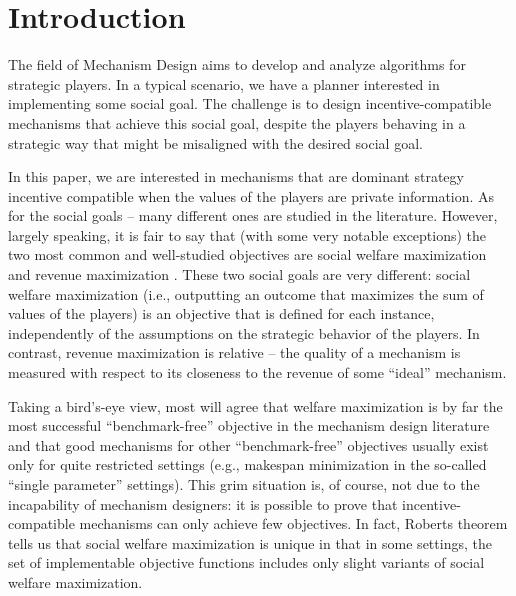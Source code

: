 \documentclass{article}
\begin{document}
\section{Introduction}

The field of Mechanism Design aims to develop and analyze algorithms for strategic players. In a typical scenario, we have a planner interested in implementing some social goal. The challenge is to design incentive-compatible mechanisms that achieve this social goal, despite the players behaving in a strategic way that might be misaligned with the desired social goal.

In this paper, we are interested in mechanisms that are dominant strategy incentive compatible when the values of the players are private information. As for the social goals -- many different ones are studied in the literature. However, largely speaking, it is fair to say that (with some very notable exceptions) the two most common and well-studied objectives are social welfare maximization \cite{Vic61,Cla71,Gro73} and revenue maximization \cite{Mye81}. These two social goals are very different: social welfare maximization (i.e., outputting an outcome that maximizes the sum of values of the players) is an objective that is defined for each instance, independently of the assumptions on the strategic behavior of the players. In contrast, revenue maximization is relative -- the quality of a mechanism is measured with respect to its closeness to the revenue of some ``ideal'' mechanism.

Taking a bird's-eye view, most will agree that welfare maximization is by far the most successful ``benchmark-free'' objective in the mechanism design literature and that good mechanisms for other ``benchmark-free'' objectives usually exist only for quite restricted settings (e.g., makespan minimization in the so-called ``single parameter'' settings). This grim situation is, of course, not due to the incapability of mechanism designers: it is possible to prove that incentive-compatible mechanisms can only achieve few objectives. In fact, Roberts theorem \cite{Rob79} tells us that social welfare maximization is unique in that in some settings, the set of implementable objective functions includes only slight variants of social welfare maximization.
\end{document}
